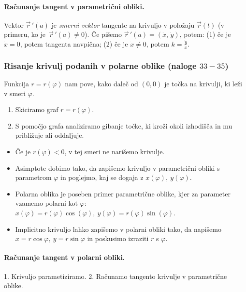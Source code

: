 \paragraph*{Računanje tangent v parametrični obliki.} Vektor $\vec{r} \, '(a)$ je \emph{smerni vektor} tangente na krivuljo v položaju $\vec{r}(t)$ (v primeru, ko je~$\vec{r} \, '(a) \neq 0$). Če pišemo $\vec{r} \, '(a) = (\dot{x}, \, \dot{y})$, potem: (1) če je $\dot{x} = 0$, potem tangenta navpična; (2) če je $\dot{x} \neq 0$, potem $\displaystyle k = \frac{\dot{y}}{\dot{x}}$.
%
\newpage
{\color{Purple} \subsubsection*{Risanje krivulj podanih v polarne oblike (naloge $33-35$)}}

Funkcija $r = r(\varphi)$ nam pove, kako daleč od $(0,0)$ je točka na krivulji, ki leži v smeri $\varphi$.

\begin{enumerate}
    \item Skiciramo graf $r = r(\varphi)$.
    \item S pomočjo grafa analiziramo gibanje točke, ki kroži okoli izhodišča in mu približuje ali oddaljuje.
\end{enumerate}

\begin{itemize}
    \item Če je $r(\varphi) < 0$, v tej smeri ne narišemo krivulje.
    \item Asimptote dobimo tako, da zapišemo krivuljo v parametrični obliki s parametrom $\varphi$ in poglejmo, kaj se dogaja z $x(\varphi), \ y(\varphi)$.
    \item Polarna oblika je poseben primer parametrične oblike, kjer za parameter vzamemo polarni kot $\varphi$: \\ $x(\varphi) = r(\varphi) \cos (\varphi), \ y(\varphi)=r(\varphi) \sin (\varphi)$.
    \item Implicitno krivuljo lahko zapišemo v polarni obliki tako, da napišemo $x = r \cos \varphi, \ y = r \sin \varphi$ in poskusimo izraziti $r$ s $\varphi$.
    
\end{itemize}
%
\paragraph*{Računanje tangent v polarni obliki.} 1. Krivuljo parametiziramo. 2. Računamo tangento krivulje v parametrične oblike.
